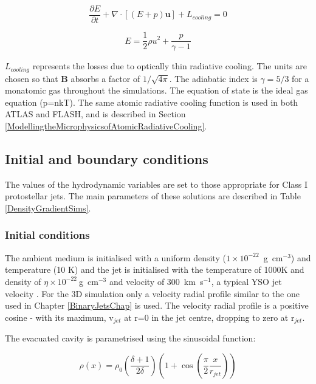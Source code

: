 \begin{equation}
\frac{\partial E}{\partial t}
+\nabla
\cdot
\left[
\left( E + p\right) \mathbf{u}
\right] + L_{cooling} = 0
\end{equation}

\begin{equation}
E =
\frac{1}{2}\rho u^2 + 
\frac{p}{\gamma-1}
\end{equation}


$L_{cooling}$ represents the losses due to optically thin radiative cooling.
The units are chosen so that $\mathbf B$ absorbs a factor of $1/\sqrt {4 \pi}$.
The adiabatic index is $\gamma = 5/3$ for a monatomic gas throughout the simulations.
The equation of state is the ideal gas equation (p=nkT).
The same atomic radiative cooling function is used in both ATLAS and FLASH, and is described in Section \ref{ModellingtheMicrophysicsofAtomicRadiativeCooling}.

\subsection{Initial and boundary conditions} 
The values of the hydrodynamic
variables are set to those appropriate for Class I protostellar jets.  
The main parameters of these solutions are described in Table \ref{DensityGradientSims}.

\subsubsection{Initial conditions}
The
ambient medium is initialised with a uniform density ($1 \times
10^{-22}$~g~cm$^{-3}$) and temperature (10 K) and the jet is
initialised with the temperature of 1000K and density of $\eta\times10^{-22}~$g~cm$^{-3}$ and velocity of
300~km~s$^{-1}$, a typical YSO jet velocity
\citep{2000prpl.conf..815E}. 
For the 3D simulation only a velocity radial profile similar to the one used in Chapter \ref{BinaryJetsChap} is used.
The velocity radial profile is a positive cosine - with its maximum, v$_{jet}$ at r=0 in the jet centre, dropping to zero at r$_{jet}$. 

The evacuated cavity is parametrised using the sinusoidal function:

\begin{equation}
\rho\left( x \right) = {\rho}_0 \left( \frac{\delta+1}{2 \delta} \right) \left(1 + \cos \left( \frac{\pi}{2} \frac{ x}{r_{jet}}
\right)
 \right)
\end{equation}


